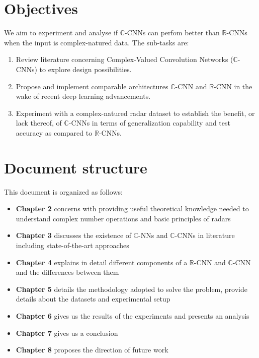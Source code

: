 
%

\section{Objectives} \label{sect:thefirst}
We aim to experiment and analyse if $\mathbb{C}$-CNNs can perfom better than $\mathbb{R}$-CNNs when the input is complex-natured data. The sub-tasks are:

\begin{enumerate}
	\item Review literature concerning Complex-Valued Convolution Networks ($\mathbb{C}$-CNNs) to explore design possibilities.
	\item Propose and implement comparable architectures $\mathbb{C}$-CNN and $\mathbb{R}$-CNN in the wake of recent deep learning advancements.
	\item Experiment with a complex-natured radar dataset to establish the benefit, or lack thereof, of $\mathbb{C}$-CNNs in terms of generalization capability and test accuracy as compared to $\mathbb{R}$-CNNs.
\end{enumerate}


\section{Document structure} \label{sect:thefirst}

This document is organized as follows:
\begin{itemize}
	\item \textbf{Chapter 2} concerns with providing useful theoretical knowledge needed to understand complex number operations and basic principles of radars
	\item \textbf{Chapter 3} discusses the existence of $\mathbb{C}$-NNs and $\mathbb{C}$-CNNs in literature including state-of-the-art approaches 
	\item \textbf{Chapter 4} explains in detail different components of a $\mathbb{R}$-CNN and $\mathbb{C}$-CNN and the differences between them
	\item \textbf{Chapter 5} details the methodology adopted to solve the problem, provide details about the datasets and experimental setup
	\item \textbf{Chapter 6} gives us the results of the experiments and presents an analysis	
	\item \textbf{Chapter 7} gives us a conclusion 
	\item \textbf{Chapter 8} proposes the direction of future work
	
\end{itemize}


